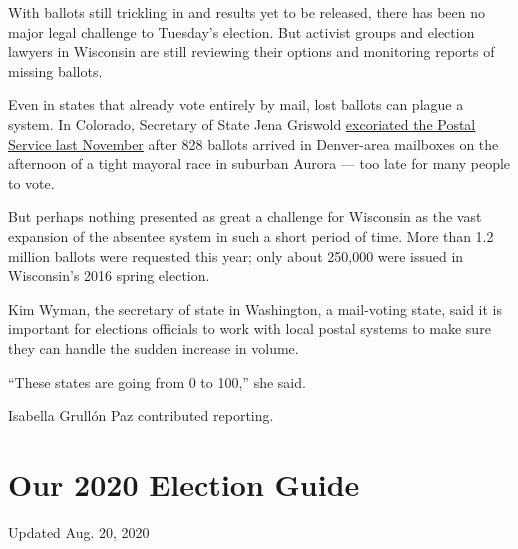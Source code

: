 With ballots still trickling in and results yet to be released, there
has been no major legal challenge to Tuesday's election. But activist
groups and election lawyers in Wisconsin are still reviewing their
options and monitoring reports of missing ballots.

Even in states that already vote entirely by mail, lost ballots can
plague a system. In Colorado, Secretary of State Jena Griswold
\href{https://www.denverpost.com/2019/11/08/election-2019-jena-griswold/}{excoriated
the Postal Service last November} after 828 ballots arrived in
Denver-area mailboxes on the afternoon of a tight mayoral race in
suburban Aurora --- too late for many people to vote.

But perhaps nothing presented as great a challenge for Wisconsin as the
vast expansion of the absentee system in such a short period of time.
More than 1.2 million ballots were requested this year; only about
250,000 were issued in Wisconsin's 2016 spring election.

Kim Wyman, the secretary of state in Washington, a mail-voting state,
said it is important for elections officials to work with local postal
systems to make sure they can handle the sudden increase in volume.

``These states are going from 0 to 100,'' she said.

Isabella Grullón Paz contributed reporting.

\hypertarget{our-2020-election-guide}{%
\section{Our 2020 Election Guide}\label{our-2020-election-guide}}

Updated Aug. 20, 2020


